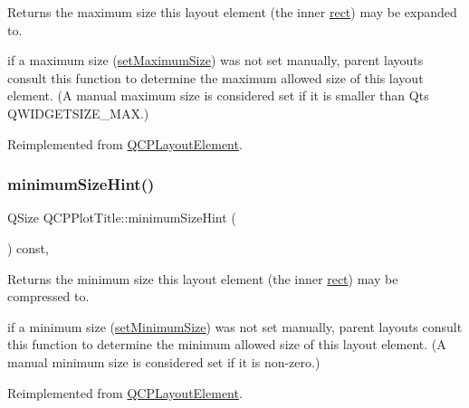 Returns the maximum size this layout element (the inner \mbox{\hyperlink{class_q_c_p_layout_element_a208effccfe2cca4a0eaf9393e60f2dd4}{rect}}) may be expanded to.

if a maximum size (\mbox{\hyperlink{class_q_c_p_layout_element_a74eb5280a737ab44833d506db65efd95}{set\+Maximum\+Size}}) was not set manually, parent layouts consult this function to determine the maximum allowed size of this layout element. (A manual maximum size is considered set if it is smaller than Qt\textquotesingle{}s Q\+W\+I\+D\+G\+E\+T\+S\+I\+Z\+E\+\_\+\+M\+AX.) 

Reimplemented from \mbox{\hyperlink{class_q_c_p_layout_element_ab5ce2ba22b36d9a3b70a1be562c326e5}{Q\+C\+P\+Layout\+Element}}.

\mbox{\label{class_q_c_p_plot_title_aeed5454134516655723bf2d0499dea24}} 
\subsubsection{\texorpdfstring{minimum\+Size\+Hint()}{minimumSizeHint()}}
{\footnotesize\ttfamily Q\+Size Q\+C\+P\+Plot\+Title\+::minimum\+Size\+Hint (\begin{DoxyParamCaption}{ }\end{DoxyParamCaption}) const\hspace{0.3cm}{\ttfamily [protected]}, {\ttfamily [virtual]}}

Returns the minimum size this layout element (the inner \mbox{\hyperlink{class_q_c_p_layout_element_a208effccfe2cca4a0eaf9393e60f2dd4}{rect}}) may be compressed to.

if a minimum size (\mbox{\hyperlink{class_q_c_p_layout_element_a5dd29a3c8bc88440c97c06b67be7886b}{set\+Minimum\+Size}}) was not set manually, parent layouts consult this function to determine the minimum allowed size of this layout element. (A manual minimum size is considered set if it is non-\/zero.) 

Reimplemented from \mbox{\hyperlink{class_q_c_p_layout_element_ab3fdb5c9a5189bb2dac10d4d25329cd8}{Q\+C\+P\+Layout\+Element}}.

\mbox{\label{class_q_c_p_plot_title_a3a01ede2da3b0b5eda33aa5274cc3523}} 
